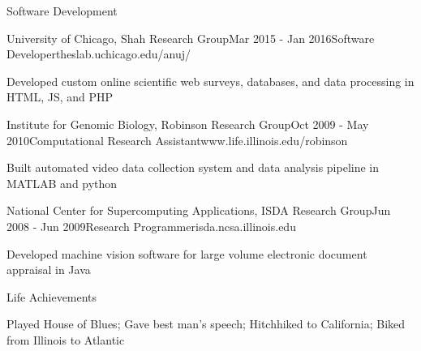 \documentclass{resume} %
\begin{document}
\begin{rSection}{Software Development}
	
\begin{rSubsection}{University of Chicago, Shah Research Group}{Mar 2015 - Jan 2016}{Software Developer}{theslab.uchicago.edu/anuj/}
	\item Developed custom online scientific web surveys, databases, and data processing in HTML, JS, and PHP
	
\end{rSubsection}


\begin{rSubsection}{Institute for Genomic Biology, Robinson Research Group}{Oct 2009 - May 2010}{Computational Research Assistant}{www.life.illinois.edu/robinson}
\item Built automated video data collection system and data analysis pipeline in MATLAB and python

\end{rSubsection}


\begin{rSubsection}{National Center for Supercomputing Applications, ISDA Research Group}{Jun 2008 - Jun 2009}{Research Programmer}{isda.ncsa.illinois.edu}
\item Developed machine vision software for large volume electronic document appraisal in Java

\end{rSubsection}




\end{rSection}



\begin{rSection}{Life Achievements}
	
	Played House of Blues;
	Gave best man's speech;
	Hitchhiked to California;
	Biked from Illinois to Atlantic
			
\end{rSection}

\end{document}
